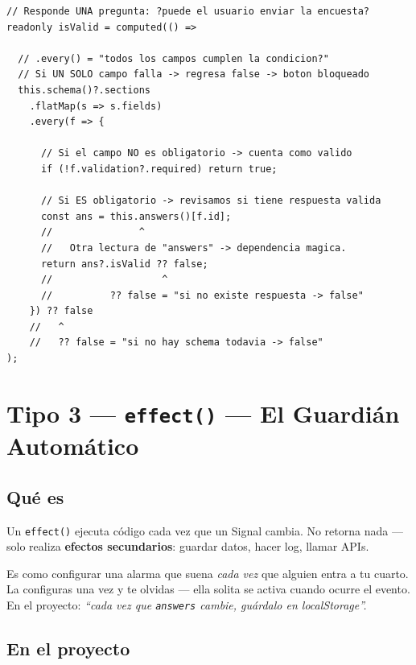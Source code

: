 \documentclass[12pt, a4paper]{article}
\begin{document}
\begin{lstlisting}
// Responde UNA pregunta: ?puede el usuario enviar la encuesta?
readonly isValid = computed(() =>

  // .every() = "todos los campos cumplen la condicion?"
  // Si UN SOLO campo falla -> regresa false -> boton bloqueado
  this.schema()?.sections
    .flatMap(s => s.fields)
    .every(f => {

      // Si el campo NO es obligatorio -> cuenta como valido
      if (!f.validation?.required) return true;

      // Si ES obligatorio -> revisamos si tiene respuesta valida
      const ans = this.answers()[f.id];
      //               ^
      //   Otra lectura de "answers" -> dependencia magica.
      return ans?.isValid ?? false;
      //                   ^
      //          ?? false = "si no existe respuesta -> false"
    }) ?? false
    //   ^
    //   ?? false = "si no hay schema todavia -> false"
);
\end{lstlisting}

\section{ Tipo 3 — \texttt{effect()} — El Guardián Automático}

\subsection{Qué es}

Un \texttt{effect()} ejecuta código cada vez que un Signal cambia.
No retorna nada — solo realiza \textbf{efectos secundarios}: guardar datos,
hacer log, llamar APIs.

\begin{tcolorbox}[analogia, title={\emoji{alarm-clock} La Alarma Automática}]
  Es como configurar una alarma que suena \textit{cada vez} que alguien
  entra a tu cuarto.\\
  La configuras una vez y te olvidas — ella solita se activa cuando
  ocurre el evento.\\[0.3cm]
  En el proyecto: \textit{``cada vez que \texttt{answers} cambie, guárdalo en localStorage''.}
\end{tcolorbox}

\subsection{ En el proyecto}
\end{document}
